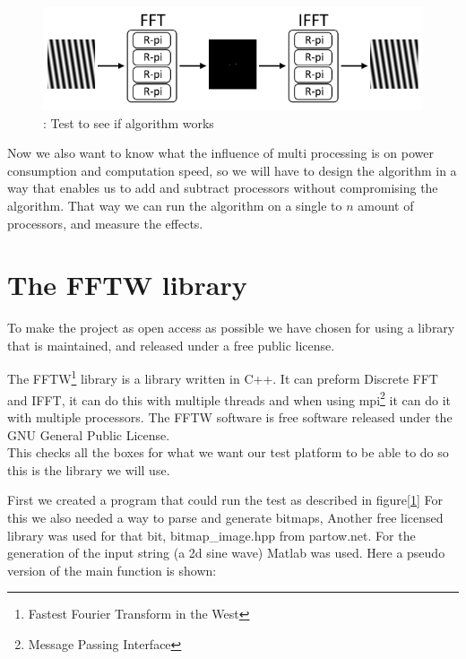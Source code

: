 \documentclass[11pt, A4, oneside]{article}
\begin{document}
\begin{figure}[!ht]
	\centering
	\includegraphics[width=\linewidth]{algorithm_test}
	\caption{: Test to see if algorithm works}
	\label{algorithm test}
\end{figure}

Now we also want to know what the influence of multi processing is on power consumption and computation speed, so we will have to design the algorithm in a way that enables us to add and subtract processors without compromising the algorithm. That way we can run the algorithm on a single to \(n\) amount of processors, and measure the effects. 

\newpage

\section{The FFTW library}

To make the project as open access as possible we have chosen for using a library that is maintained, and released under a free public license.\par The FFTW\footnote{Fastest Fourier Transform in the West} library is a library written in C++. It can preform Discrete FFT and IFFT, it can do this with multiple threads and when using mpi\footnote{Message Passing Interface} it can do it with multiple processors. The FFTW software is free software released under the GNU General Public License. \\ This checks all the boxes for what we want our test platform to be able to do so this is the library we will use. \par 
First we created a program that could run the test as described in figure[\ref{algorithm test}] For this we also needed a way to parse and generate bitmaps, Another free licensed library was used for that bit,  bitmap\_image.hpp from partow.net. For the generation of the input string (a 2d sine wave) Matlab was used. Here a pseudo version of the main function is shown: 
\end{document}
